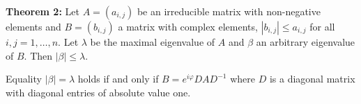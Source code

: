 \textbf{Theorem 2:} Let $A = (a_{i,j})$ be an irreducible matrix with non-negative elements and $B = (b_{i,j})$ a matrix with complex elements, $|b_{i,j}| \leq a_{i,j}$ for all $i, j = 1, \ldots, n$. Let $\lambda$ be the maximal eigenvalue of $A$ and $\beta$ an arbitrary eigenvalue of $B$. Then $|\beta| \leq \lambda$.

Equality $|\beta| = \lambda$ holds if and only if $B = e^{i\varphi} D A D^{-1}$ where $D$ is a diagonal matrix with diagonal entries of absolute value one.
